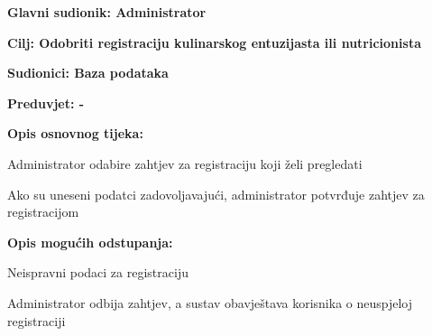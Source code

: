 				\noindent {}
					\begin{packed_item}
	
						\item \textbf{Glavni sudionik: Administrator}
						\item  \textbf{Cilj: Odobriti registraciju kulinarskog entuzijasta ili nutricionista}
						\item  \textbf{Sudionici: Baza podataka}
						\item  \textbf{Preduvjet: -} 
						\item  \textbf{Opis osnovnog tijeka:}
						
						\item[] \begin{packed_enum}
	
							\item Administrator odabire zahtjev za registraciju koji želi pregledati
					
							\item Ako su uneseni podatci zadovoljavajući, administrator potvrđuje zahtjev za registracijom
						\end{packed_enum}
						
						\item  \textbf{Opis mogućih odstupanja:}
						
						\item[] \begin{packed_item}
	
							\item[1.a] Neispravni podaci za registraciju
							\item[] \begin{packed_enum}
								
								\item Administrator odbija zahtjev, a sustav obavještava korisnika o neuspjeloj registraciji
							\end{packed_enum}
						\end{packed_item}
					\end{packed_item}
					
